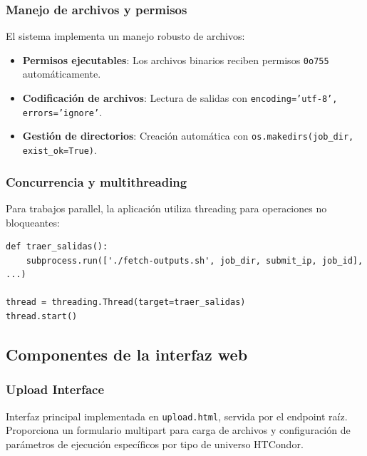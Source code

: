 \subsubsection{Manejo de archivos y permisos}
\noindent

El sistema implementa un manejo robusto de archivos:

\begin{itemize}
	\item \textbf{Permisos ejecutables}: Los archivos binarios reciben permisos \texttt{0o755} automáticamente.
	\item \textbf{Codificación de archivos}: Lectura de salidas con \texttt{encoding='utf-8', errors='ignore'}.
	\item \textbf{Gestión de directorios}: Creación automática con \texttt{os.makedirs(job\_dir, exist\_ok=True)}.
\end{itemize}

\subsubsection{Concurrencia y multithreading}
\noindent

Para trabajos parallel, la aplicación utiliza threading para operaciones no bloqueantes:

\begin{verbatim}
def traer_salidas():
    subprocess.run(['./fetch-outputs.sh', job_dir, submit_ip, job_id], ...)

thread = threading.Thread(target=traer_salidas)
thread.start()
\end{verbatim}

\subsection{Componentes de la interfaz web}
\noindent

\subsubsection{Upload Interface}
\noindent
Interfaz principal implementada en \texttt{upload.html}, servida por el endpoint raíz. Proporciona un formulario multipart para carga de archivos y configuración de parámetros de ejecución específicos por tipo de universo HTCondor.

